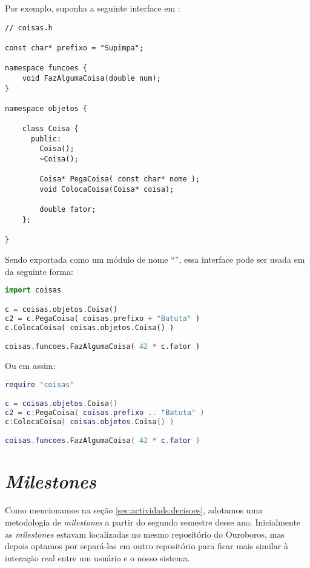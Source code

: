 Por exemplo, suponha a seguinte interface em \CXX{}:

\vspace{1em}
\begin{lstlisting}
// coisas.h

const char* prefixo = "Supimpa";

namespace funcoes {
    void FazAlgumaCoisa(double num);
}

namespace objetos {

    class Coisa {
      public:
        Coisa();
        ~Coisa();
        
        Coisa* PegaCoisa( const char* nome );
        void ColocaCoisa(Coisa* coisa);
        
        double fator;
    };

}
\end{lstlisting}
\vspace{1em}

Sendo exportada como um módulo de nome ``'', essa interface pode
ser usada em  da seguinte forma:

\vspace{1em}
\begin{lstlisting}[language=python]
import coisas

c = coisas.objetos.Coisa()
c2 = c.PegaCoisa( coisas.prefixo + "Batuta" )
c.ColocaCoisa( coisas.objetos.Coisa() )

coisas.funcoes.FazAlgumaCoisa( 42 * c.fator )
\end{lstlisting}
\vspace{1em}

Ou em  assim:

\vspace{1em}
\begin{lstlisting}[language=lua]
require "coisas"

c = coisas.objetos.Coisa()
c2 = c:PegaCoisa( coisas.prefixo .. "Batuta" )
c:ColocaCoisa( coisas.objetos.Coisa() )

coisas.funcoes.FazAlgumaCoisa( 42 * c.fator )
\end{lstlisting}
\vspace{1em}


\section{\textit{Milestones}}
\label{cap:resultados:milestones}

Como mencionamos na seção \ref{sec:actividads:decisoes}, adotamos uma metodologia de
\textit{milestones} a partir do segundo semestre desse ano.
Inicialmente as \textit{milestones} estavam localizadas no mesmo repositório do 
Ouroboros, mas depois optamos por separá-las em outro repositório para ficar mais
similar à interação real entre um usuário e o nosso sistema\footnotemark{}. 

